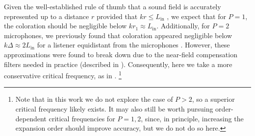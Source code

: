 Given the well-established rule of thumb that a sound field is accurately represented up to a distance $r$ provided that $k r \leq L_\textrm{in}$ \citep{WardAbhayapala2001}, we expect that for $P = 1$, the coloration should be negligible below $k r_1 \approx L_\textrm{in}$.
Additionally, for $P = 2$ microphones, we previously found that coloration appeared negligible below $k \Delta \approx 2 L_\textrm{in}$ for a listener equidistant from the microphones \citep[cf.~Fig.~5]{TylkaChoueiri2016}.
However, these approximations were found to break down due to the near-field compensation filters needed in practice (described in ).
Consequently, here we take a more conservative critical frequency, as in .%
\footnote{Note that in this work we do not explore the case of $P > 2$, so a superior critical frequency likely exists.
It may also still be worth pursuing order-dependent critical frequencies for $P = 1,2$, since, in principle, increasing the expansion order should improve accuracy, but we do not do so here.}